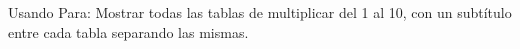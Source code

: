 ﻿
Usando Para: Mostrar todas las tablas de multiplicar del 1 al 10, con un subtítulo entre cada tabla separando las mismas.



\volverindice
\newpage
